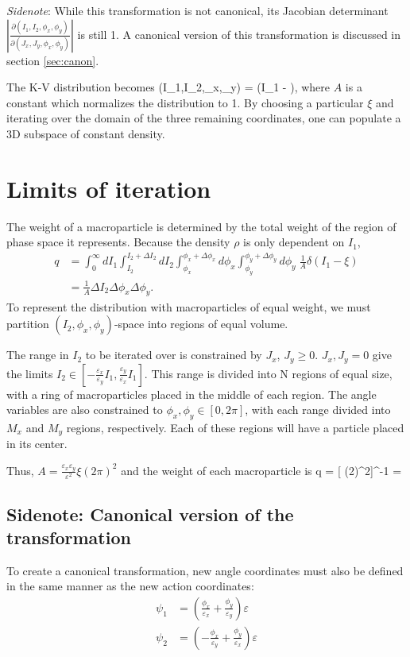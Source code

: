 \textit{Sidenote}: While this transformation is not canonical, its Jacobian determinant $\left\vert\frac{\partial(I_1,I_2,\phi_x,\phi_y)}{\partial(J_x,J_y,\phi_x,\phi_y)}\right\vert$ is still 1.  A canonical version of this transformation is discussed in section \ref{sec:canon}.

The K-V distribution becomes
\Begineq
	\rho(I_1,I_2,\phi_x,\phi_y) =  \delta(I_1 - \xi),
\Endeq
where $A$ is a constant which normalizes the distribution to 1.  By choosing a particular $\xi$ and iterating over the domain of the three remaining coordinates, one can populate a 3D subspace of constant density.

\section{Limits of iteration}
The weight of a macroparticle is determined by the total weight of the region of phase space it represents.  Because the density $\rho$ is only dependent on $I_1$,
\begin{align}
	q & = \int_{0}^{\infty} dI_1 \int_{I_2}^{I_2 + \Delta I_2} dI_2 \int_{\phi_x}^{\phi_x + \Delta \phi_x} d\phi_x \int_{\phi_y}^{\phi_y + \Delta \phi_y} d\phi_y \; \frac{1}{A} \delta(I_1 - \xi) \\
	  & = \frac{1}{A} \Delta I_2 \Delta \phi_x \Delta \phi_y.
\end{align}
To represent the distribution with macroparticles of equal weight, we must partition $(I_2,\phi_x,\phi_y)$-space into regions of equal volume.

The range in $I_2$ to be iterated over is constrained by $J_x$, $J_y \geq 0$.  $J_x, J_y = 0$ give the limits $I_2 \in [-\frac{\varepsilon_x}{\varepsilon_y} I_1, \frac{\varepsilon_y}{\varepsilon_x} I_1]$.  This range is divided into N regions of equal size, with a ring of macroparticles placed in the middle of each region.  The angle variables are also constrained to $\phi_x, \phi_y \in [0, 2\pi]$, with each range divided into $M_x$ and $M_y$ regions, respectively.  Each of these regions will have a particle placed in its center.

Thus, $A = \frac{\varepsilon_x \varepsilon_y}{\varepsilon^2} \xi (2\pi)^2$ and the weight of each macroparticle is
\Begineq
	q = [ \xi (2\pi)^2]^{-1}     = 
\Endeq


\subsection*{Sidenote: Canonical version of the transformation}
\label{sec:canon}
To create a canonical transformation, new angle coordinates must also be defined in the same manner as the new action coordinates:
\begin{align}
	\psi_1 & = \left( \frac{\phi_x}{\varepsilon_x} + \frac{\phi_y}{\varepsilon_y} \right) \varepsilon  \\
	\psi_2 & = \left( -\frac{\phi_x}{\varepsilon_y} + \frac{\phi_y}{\varepsilon_x} \right) \varepsilon
\end{align}

